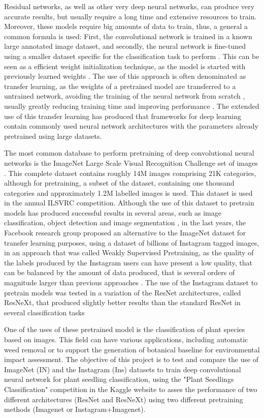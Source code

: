 \documentclass[10pt,onecolumn,titlepage,letterpaper]{article}
\begin{document}
Residual networks, as well as other very deep neural networks, can produce very accurate results, but usually require a long time and extensive resources to train. Moreover, these models require big amounts of data to train, thus, a general a common formula is used: First, the convolutional network is trained in a known large annotated image dataset, and secondly, the neural network is fine-tuned using a smaller dataset specific for the classification task to perform \cite{Mahajan2018}. This can be seen as a efficient weight initialization technique, as the model is started with previously learned weights . The use of this approach is often denominated as transfer learning, as the weights of a pretrained model are transferred to a untrained network, avoiding the training of the neural network from scratch \cite{Wani2019}, usually greatly reducing training time and improving performance \cite{Kolesnikov2019}. The extended use of this transfer learning has produced that frameworks for deep learning contain commonly used neural network architectures with the parameters already pretrained using large datasets.

The most common database to perform pretraining of deep convolutional neural networks is the ImageNet Large Scale Visual Recognition Challenge set of images \cite{Russakovsky2015}. This complete dataset contains roughly 14M images comprising 21K categories, although for pretraining, a subset of the dataset, containing one thousand categories and approximately 1.2M labelled images is used. This dataset is used in the annual ILSVRC competition. Although the use of this dataset to pretrain models has produced successful results in several areas, such as image classification, object detection and image segmentation \cite{Huh2016}, in the last years, the Facebook research group proposed an alternative to the ImageNet dataset for transfer learning purposes, using a dataset of billions of Instagram tagged images, in an approach that was called Weakly Supervised Pretraining, as the quality of the labels produced by the Instagram users can have present a low quality, that can be balanced by the amount of data produced, that is several orders of magnitude larger than previous approaches \cite{Mahajan2018}. The use of the Instagram dataset to pretrain models was tested in a variation of the ResNet architectures, called ResNeXt, that produced slightly better results than the standard ResNet in several classification tasks \cite{Xie2017}

One of the uses of these pretrained model is the classification of plant species based on images. This field can have various applications, including automatic weed removal \cite{Giselsson2017} or to support the generation of botanical baseline for environmental impact assessment. The objective of this project is to test and compare the use of ImageNet (IN) and the Instagram (Ins) datasets to train deep convolutional neural network for plant seedling classification, using the "Plant Seedlings Classification" competition in the Kaggle website to asses the performance of two different architectures (ResNet and ResNeXt) using two different pretraining methods (Imagenet or Instagram+Imagenet).
\end{document}
